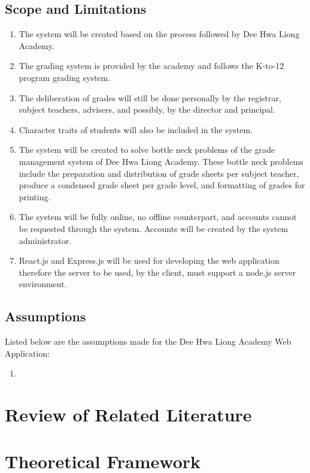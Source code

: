 \documentclass[11pt,a4paper,titlepage]{article}
\let\stdsection\section
\renewcommand\section{\newpage\stdsection}
\begin{document}
\subsection{Scope and Limitations}
\begin{enumerate}
	\item The system will be created based on the process followed by Dee Hwa Liong Academy.
	\item The grading system is provided by the academy and follows the K-to-12 program grading system.
	\item The deliberation of grades will still be done personally by the registrar, subject teachers, advisers, and possibly, by the director and principal.
	\item Character traits of students will also be included in the system.
	\item The system will be created to solve bottle neck problems of the grade management system of Dee Hwa Liong Academy. These bottle neck problems include the preparation and distribution of grade sheets per subject teacher, produce a condensed grade sheet per grade level, and formatting of grades for printing.
	\item The system will be fully online, no offline counterpart, and accounts cannot be requested through the system. Accounts will be created by the system administrator.
	\item React.js and Express.js will be used for developing the web application therefore the server to be used, by the client, must support a node.js server environment.
\end{enumerate}

\subsection{Assumptions}
Listed below are the assumptions made for the Dee Hwa Liong Academy Web Application:
\begin{enumerate}
	\item 
\end{enumerate}

\section{Review of Related Literature}
 

\section{Theoretical Framework}
\end{document}
